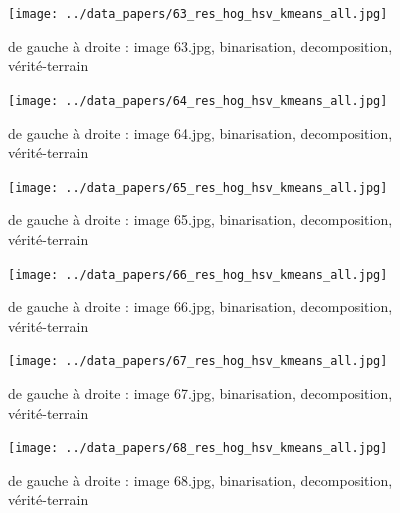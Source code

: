 \documentclass{book}
\begin{document}
\begin{figure}[H]
\begin{center}
\texttt{[image: ../data\_papers/63\_res\_hog\_hsv\_kmeans\_all.jpg]}
\end{center}
\caption{de gauche à droite : image 63.jpg, binarisation, decomposition, vérité-terrain}
\label{63}
\end{figure}
\clearpage


\begin{figure}[H]
\begin{center}
\texttt{[image: ../data\_papers/64\_res\_hog\_hsv\_kmeans\_all.jpg]}
\end{center}
\caption{de gauche à droite : image 64.jpg, binarisation, decomposition, vérité-terrain}
\label{64}
\end{figure}
\clearpage


\begin{figure}[H]
\begin{center}
\texttt{[image: ../data\_papers/65\_res\_hog\_hsv\_kmeans\_all.jpg]}
\end{center}
\caption{de gauche à droite : image 65.jpg, binarisation, decomposition, vérité-terrain}
\label{65}
\end{figure}
\clearpage


\begin{figure}[H]
\begin{center}
\texttt{[image: ../data\_papers/66\_res\_hog\_hsv\_kmeans\_all.jpg]}
\end{center}
\caption{de gauche à droite : image 66.jpg, binarisation, decomposition, vérité-terrain}
\label{66}
\end{figure}
\clearpage


\begin{figure}[H]
\begin{center}
\texttt{[image: ../data\_papers/67\_res\_hog\_hsv\_kmeans\_all.jpg]}
\end{center}
\caption{de gauche à droite : image 67.jpg, binarisation, decomposition, vérité-terrain}
\label{67}
\end{figure}
\clearpage


\begin{figure}[H]
\begin{center}
\texttt{[image: ../data\_papers/68\_res\_hog\_hsv\_kmeans\_all.jpg]}
\end{center}
\caption{de gauche à droite : image 68.jpg, binarisation, decomposition, vérité-terrain}
\label{68}
\end{figure}
\clearpage
\end{document}
